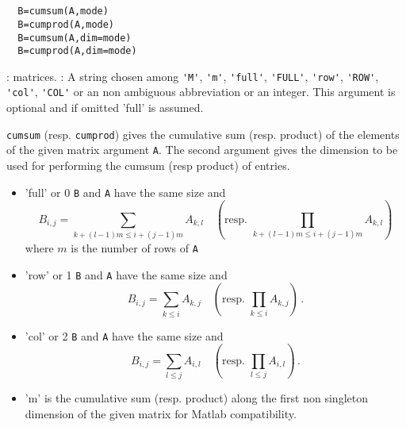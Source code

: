 \begin{mandesc}
  \\ %
  \\ %
\end{mandesc}
\begin{calling_sequence}
\begin{verbatim}
  B=cumsum(A,mode)  
  B=cumprod(A,mode)  
  B=cumsum(A,dim=mode) 
  B=cumprod(A,dim=mode)  
\end{verbatim}
\end{calling_sequence}
\begin{parameters}
  \begin{varlist}
     : matrices.
     : A string chosen among \verb+'M'+, \verb+'m'+, \verb+'full'+, \verb+'FULL'+, \verb+'row'+,
    \verb+'ROW'+, \verb+'col'+, \verb+'COL'+ or an non ambiguous abbreviation or an integer. 
    This argument is optional and if omitted 'full' is assumed.
  \end{varlist}
\end{parameters}
\begin{mandescription}
  \verb+cumsum+ (resp. \verb+cumprod+) gives the cumulative sum (resp. product) of the 
  elements of the given matrix argument \verb+A+. 
  The second argument gives the dimension to be used for performing the cumsum (resp product) of entries.       
  \begin{itemize}
    \item 'full' or 0 \verb+B+ and \verb+A+ have the same size and 
     $$B_{i,j} = \sum_{k+(l-1)m \le i+(j-1)m } A_{k,l} \quad \left( \text{resp. } \prod_{k+(l-1)m \le i+(j-1)m } A_{k,l} \right)$$ 
     where $m$ is the number of rows of \verb+A+
    \item 'row' or 1  \verb+B+ and \verb+A+ have the same size and 
     $$B_{i,j} = \sum_{k\le i} A_{k,j}\quad \left(\text{resp. }  \prod_{k\le i} A_{k,j}\right) \,. $$     
    \item 'col' or 2  \verb+B+ and \verb+A+ have the same size and 
         $$B_{i,j} = \sum_{l\le j} A_{i,l} \quad \left(\text{resp. }  \prod_{l\le j} A_{i,l}  \right) \,. $$     
    \item 'm' is the cumulative sum (resp. product) along the first non singleton dimension of the given matrix 
      for Matlab compatibility. 
  \end{itemize}
\end{mandescription}
\begin{examples}
  \begin{program}
  \end{program}
\end{examples}
\begin{manseealso}
     
\end{manseealso}


